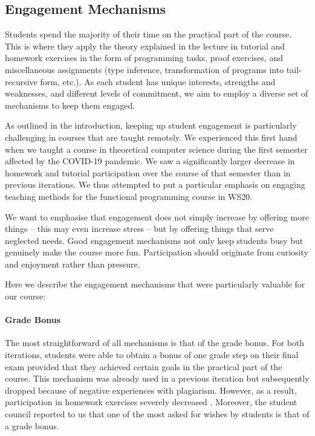 \subsection{Engagement Mechanisms}\label{sec:engagement}

Students spend the majority of their time on the practical part of the course.
This is where they apply the theory explained in the lecture in tutorial and homework exercises in the form of programming tasks, proof exercises, and miscellaneous assignments (type inference, transformation of programs into tail-recursive form, etc.).
As each student has unique interests, strengths and weaknesses, and different levels of commitment,
we aim to employ a diverse set of mechanisms to keep them engaged.

As outlined in the introduction, keeping up student engagement is particularly challenging in courses that are taught remotely. We experienced this first hand when we taught a course in theoretical computer science during the first semester affected by the COVID-19 pandemic. We saw a significantly larger decrease in homework and tutorial participation over the course of that semester than in previous iterations. We thus attempted to put a particular emphasis on engaging teaching methods for the functional programming course in WS20.

We want to emphasise that engagement does not simply
increase by offering more things -- this may even increase stress --
but by offering things that serve neglected needs.
Good engagement mechanisms not only keep students busy
but genuinely make the course more fun.
Participation should originate from curiosity and enjoyment rather than pressure.

Here we describe the engagement mechanisms that were particularly valuable for our course:

\paragraph{Grade Bonus}
The most straightforward of all mechanisms is
that of the grade bonus.
For both iterations,
students were able to obtain a bonus of one grade step on their final exam provided that they achieved certain goals in the practical part of the course.
This mechanism was already used in a previous iteration
but subsequently dropped because of negative experiences with plagiarism.
However, as a result, participation in homework exercises
severely decreased \cite{next_1100}.
Moreover, the student council reported to us that one of the most asked for
wishes by students is that of a grade bonus.

